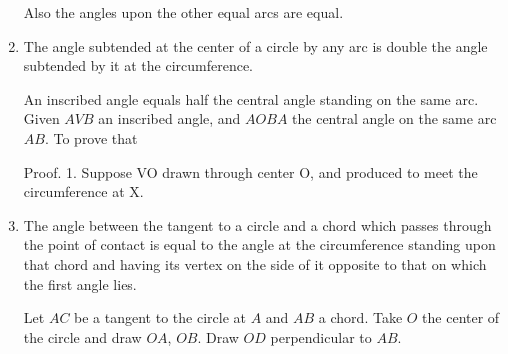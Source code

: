 \begin{enumerate}
    Also the angles upon the other equal arcs are equal.


\item The angle subtended at the center of a circle by any arc is double the
    angle subtended by it at the circumference.  



    An inscribed angle equals half the central angle standing on the same arc.
    Given $AVB$ an inscribed angle, and $AOBA$ the central angle on the same arc
    $AB$.  To prove that %

    Proof.  1. Suppose VO drawn through center O, and produced to meet the
    circumference at X.

%
%
%
%
%
%
%
%
%
%

\item The angle between the tangent to a circle and a chord which passes through
    the point of contact is equal to the angle at the circumference standing
    upon that chord and having its vertex on the side of it opposite to that
    on which the first angle lies.

    Let $AC$ be a tangent to the circle at $A$ and $AB$ a chord. Take $O$ the
    center of the circle and draw $OA$, $OB$. Draw $OD$ perpendicular to $AB$.


\end{enumerate}
